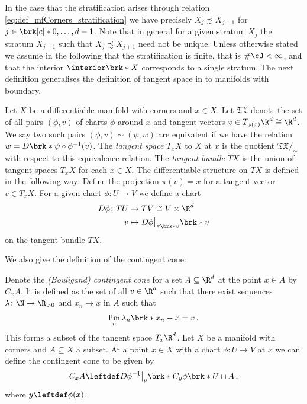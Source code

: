In the case that the stratification arises through relation \eqref{eq:def_mfCorners_stratification}
we have precisely $X_{j}\precsim X_{j+1}$ for $j\in\brk[c]*{0,\dots,d-1}$.
Note that in general for a given stratum $X_j$ the stratum $X_{j+1}$ such that $X_j\precsim X_{j+1}$ need not be unique.
Unless otherwise stated we assume in the following that the stratification is finite, that is $\#\cJ<\infty$, and 
that the interior $\openX$ corresponds to a single stratum.
%
The next definition generalises the definition of tangent space in \cite[§1.2]{Jost2002} to manifolds with boundary.
\begin{definition}
  \label{df:tangentSpace}
  Let $X$ be a differentiable manifold with corners and $x\in X$. Let $\mathfrak{TX}$ denote the set of all
  pairs $(\phi,v)$ of charts $\phi$ around $x$ and tangent vectors
  $v\in T_{\phi(x)}\R^d\cong \R^d$. We say two such pairs $(\phi,v)\sim (\psi,w)$ are equivalent if
  we have the relation $w=D\brk*{\psi\circ\phi^{-1}}(v)$. The \emph{tangent space $T_xX$} to $X$ at $x$ is the quotient
  ${\mathfrak{TX}}\big/_{\sim}$ with respect to this equivalence relation.
  The \emph{tangent bundle} $TX$ is the union of tangent spaces $T_xX$ for each $x\in X$.
  The differentiable structure on $TX$ is defined in the following way:
  Define the projection $\pi(v)=x$ for a tangent vector $v\in T_xX$.
  For a given chart $\phi\colon U\to V$ we define a chart
  \begin{align*} 
    D\phi\colon TU&\to TV\cong V\times\R^d\\
    v&\mapsto D\phi\big\vert_{\pi\brk*{v}}\brk*{v}
  \end{align*}
  on the tangent bundle $TX$.
\end{definition}
We also give the definition of the contingent cone:
\begin{definition}
  \label{df:contingentCone}
  Denote the \emph{(Bouligand) contingent cone} for a set $A\subseteq \R^d$ at the point $x\in\overline{A}$ by $C_xA$.
  It is defined as the set of all $v\in\R^d$ such that there exist sequences $\lambda\colon\N\to\R_{>0}$ and $x_n\to x$ in
  $A$ such that
  $$\lim_n\lambda_n\brk*{x_n-x}=v\,.$$
  This forms a subset of the tangent space $T_x\R^d$.
  Let $X$ be a manifold with corners and $A\subseteq X$ a subset. At a point $x\in X$ with a chart $\phi\colon U\to V$ at $x$ we can define the 
  contingent cone to be given by 
  $$C_xA\leftdef D\phi^{-1}\big\vert_{y}\brk*{C_y\phi\brk*{U\cap A}}\,,$$
  where $y\leftdef\phi(x)$.
\end{definition}
